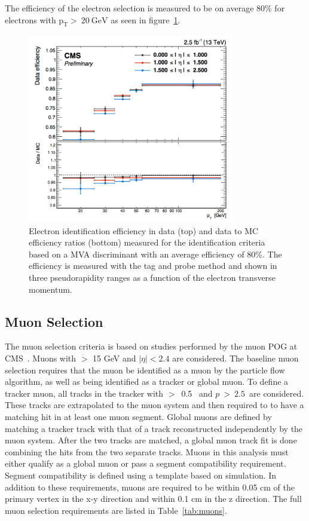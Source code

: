 The efficiency of the electron selection is measured to be on average 80\% for electrons with $\mathrm{p_{T} >~ 20~GeV}$ as seen in figure~\ref{fig:electronideff}.

\begin{figure}[!ht]
  \begin{center}
      \includegraphics[width=0.8\textwidth]{evtsel/figs/Electron_MVA_efficiency.pdf}
    \caption{
      \label{fig:electronideff}
      Electron identification efficiency in data (top) and data to MC efficiency ratios (bottom)
      measured for the identification criteria based on a MVA discriminant with an average efficiency of 80\%.
      The efficiency is measured with the tag and probe method and shown in three pseudorapidity ranges as a function of the electron transverse momentum.
    }
  \end{center}
\end{figure}
  

\subsection{Muon Selection}
\label{ssec:musel}
The muon selection criteria is based on studies performed by the muon POG at CMS~\cite{tdr1}\cite{muonReco}.
Muons with \pt $>$ 15 GeV and $|\eta|<2.4$ are considered. 
The baseline muon selection requires that the muon be identified as a muon by the particle flow algorithm,
as well as being identified as a tracker or global muon.
To define a tracker muon, all tracks in the tracker with \pt $>$~0.5 \gev\ and $p~>~2.5$~\gev are considered.
These tracks are extrapolated to the muon system and then required to to have a matching hit in at least one muon segment.
Global muons are defined by matching a tracker track with that of a track reconstructed independently by the muon system.
After the two tracks are matched, a global muon track fit is done combining the hits from the two separate tracks.
Muons in this analysis must either qualify as a global muon or pass a segment compatibility requirement.
Segment compatibility is defined using a template based on simulation.
In addition to these requirements, muons are required to be within 0.05 cm of the primary vertex in the x-y direction and within 0.1 cm in the z direction.
The full muon selection requirements are listed in Table~\ref{tab:muons}.


